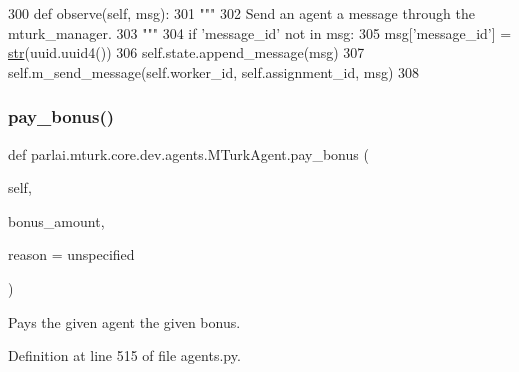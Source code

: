 \begin{DoxyCode}
300     \textcolor{keyword}{def }observe(self, msg):
301         \textcolor{stringliteral}{"""}
302 \textcolor{stringliteral}{        Send an agent a message through the mturk\_manager.}
303 \textcolor{stringliteral}{        """}
304         \textcolor{keywordflow}{if} \textcolor{stringliteral}{'message\_id'} \textcolor{keywordflow}{not} \textcolor{keywordflow}{in} msg:
305             msg[\textcolor{stringliteral}{'message\_id'}] = \hyperlink{namespacegenerate__task__READMEs_a5b88452ffb87b78c8c85ececebafc09f}{str}(uuid.uuid4())
306         self.state.append\_message(msg)
307         self.m\_send\_message(self.worker\_id, self.assignment\_id, msg)
308 
\end{DoxyCode}
\mbox{\label{classparlai_1_1mturk_1_1core_1_1dev_1_1agents_1_1MTurkAgent_a9171ff6eb3ff172868987fafba8f8efc}} 
\subsubsection{\texorpdfstring{pay\+\_\+bonus()}{pay\_bonus()}}
{\footnotesize\ttfamily def parlai.\+mturk.\+core.\+dev.\+agents.\+M\+Turk\+Agent.\+pay\+\_\+bonus (\begin{DoxyParamCaption}\item[{}]{self,  }\item[{}]{bonus\+\_\+amount,  }\item[{}]{reason = {\ttfamily \textquotesingle{}unspecified\textquotesingle{}} }\end{DoxyParamCaption})}

\begin{DoxyVerb}Pays the given agent the given bonus.
\end{DoxyVerb}
 

Definition at line 515 of file agents.\+py.


